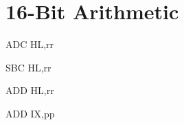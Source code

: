 \section{16-Bit Arithmetic}

\vspace*{0.7ex} %
\begin{minipage}{\textwidth}

\begin{instrtable}

	\begin{instruction}{ADC HL,rr} 
			\FlagsADCrr
		\SkipToOpCode
	\end{instruction}

	\begin{instruction}{SBC HL,rr} 
			\FlagsSBCrr
		\SkipToOpCode
	\end{instruction}

	\begin{instruction}{ADD HL,rr} 
			\FlagsADDrr
	\end{instruction}

	\begin{instruction}{ADD IX,pp} 
			\FlagsADDrr
		\SkipToOpCode
	\end{instruction}


\end{instrtable}
\end{minipage}
